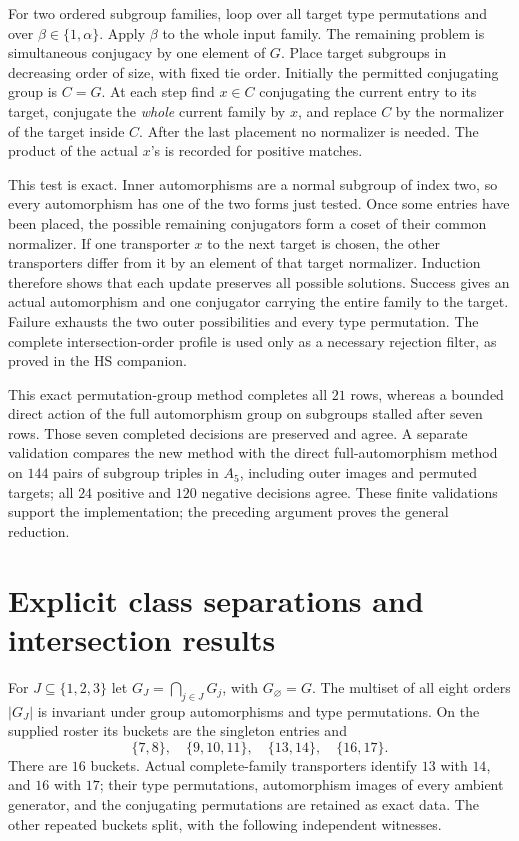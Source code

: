 \documentclass[11pt]{article}
\begin{document}
For two ordered subgroup families, loop over all target type permutations
and over $\beta\in\{1,\alpha\}$. Apply $\beta$ to the whole input family.
The remaining problem is simultaneous conjugacy by one element of $G$.
Place target subgroups in decreasing order of size, with fixed tie order.
Initially the permitted conjugating group is $C=G$. At each step find
$x\in C$ conjugating the current entry to its target, conjugate the
\emph{whole} current family by $x$, and replace $C$ by the normalizer of
the target inside $C$. After the last placement no normalizer is needed.
The product of the actual $x$'s is recorded for positive matches.

This test is exact. Inner automorphisms are a normal subgroup of index
two, so every automorphism has one of the two forms just tested. Once
some entries have been placed, the possible remaining conjugators form
a coset of their common normalizer. If one transporter $x$ to the next
target is chosen, the other transporters differ from it by an element of
that target normalizer. Induction therefore shows that each update
preserves all possible solutions. Success gives an actual automorphism
and one conjugator carrying the entire family to the target. Failure
exhausts the two outer possibilities and every type permutation.
The complete intersection-order profile is used only as a necessary
rejection filter, as proved in the HS companion.

This exact permutation-group method completes all $21$ rows, whereas a
bounded direct action of the full automorphism group on subgroups stalled
after seven rows. Those seven completed decisions are preserved and
agree. A separate validation compares the new method with the direct
full-automorphism method on $144$ pairs of subgroup triples in $A_5$,
including outer images and permuted targets; all $24$ positive and $120$
negative decisions agree. These finite validations support the
implementation; the preceding argument proves the general reduction.

\section{Explicit class separations and intersection results}
For $J\subseteq\{1,2,3\}$ let
$G_J=\bigcap_{j\in J}G_j$, with $G_\varnothing=G$.
The multiset of all eight orders $|G_J|$ is invariant under group
automorphisms and type permutations. On the supplied roster its buckets
are the singleton entries and
\[
 \{7,8\},\quad \{9,10,11\},\quad
 \{13,14\},\quad \{16,17\}.
\]
There are $16$ buckets. Actual complete-family transporters identify
$13$ with $14$, and $16$ with $17$; their type permutations,
automorphism images of every ambient generator, and the conjugating
permutations are retained as exact data. The other repeated buckets
split, with the following independent witnesses.
\end{document}
